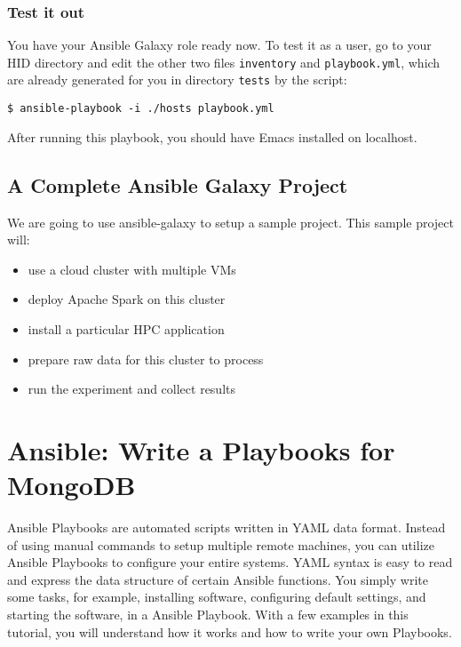 \subsubsection{Test it out}\label{test-it-out}

You have your Ansible Galaxy role ready now. To test it as a user, go to
your HID directory and edit the other two files \texttt{inventory} and
\texttt{playbook.yml}, which are already generated for you in directory
\texttt{tests} by the script:

\begin{verbatim}
$ ansible-playbook -i ./hosts playbook.yml
\end{verbatim}

After running this playbook, you should have Emacs installed on
localhost.

\subsection{A Complete Ansible Galaxy
Project}\label{a-complete-ansible-galaxy-project}

We are going to use ansible-galaxy to setup a sample project. This
sample project will:

\begin{itemize}
\tightlist
\item
  use a cloud cluster with multiple VMs
\item
  deploy Apache Spark on this cluster
\item
  install a particular HPC application
\item
  prepare raw data for this cluster to process
\item
  run the experiment and collect results
\end{itemize}
\section{Ansible: Write a Playbooks for
MongoDB}\label{ansible-write-a-playbooks-for-mongodb}

Ansible Playbooks are automated scripts written in YAML data format.
Instead of using manual commands to setup multiple remote machines, you
can utilize Ansible Playbooks to configure your entire systems. YAML
syntax is easy to read and express the data structure of certain Ansible
functions. You simply write some tasks, for example, installing
software, configuring default settings, and starting the software, in a
Ansible Playbook. With a few examples in this tutorial, you will
understand how it works and how to write your own Playbooks.

